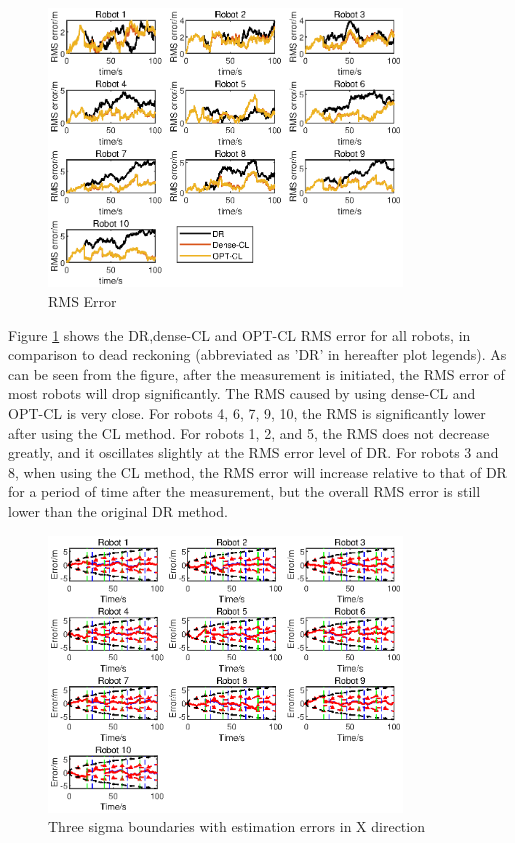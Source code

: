 \documentclass[conference]{IEEEtran}
\begin{document}
\begin{figure}
	\centering
	\includegraphics[width=3.7in]{Fig/fig2_rmse.eps}
	\caption{RMS Error}
	\label{fig::rmse}
\end{figure}
Figure \ref{fig::rmse} shows the DR,dense-CL and OPT-CL RMS error for all robots, in comparison to dead reckoning (abbreviated as 'DR' in hereafter plot legends).
As can be seen from the figure, after the measurement is initiated, the RMS error of most robots will drop significantly. The RMS caused by using dense-CL and OPT-CL is very close. For robots 4, 6, 7, 9, 10, the RMS is significantly lower after using the CL method. For robots 1, 2, and 5, the RMS does not decrease greatly, and it oscillates slightly at the RMS error level of DR. For robots 3 and 8, when using the CL method, the RMS error will increase relative to that of DR for a period of time after the measurement, but the overall RMS error is still lower than the original DR method.
\begin{figure}
	\centering
	\includegraphics[width=3.7in]{Fig/fig3_3sigma.eps}
	\caption{Three sigma boundaries with estimation errors in X direction}
	\label{fig::3sigma}
\end{figure}
\end{document}
